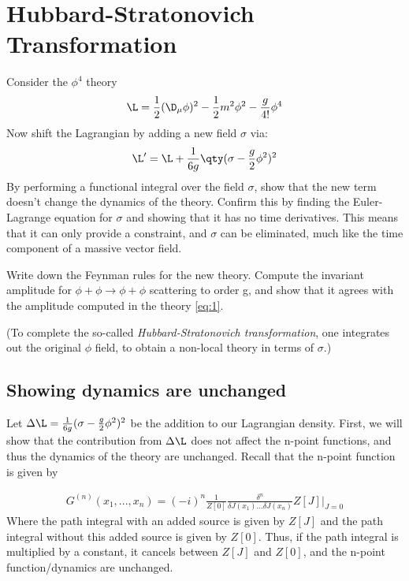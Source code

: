 \documentclass[12pt]{article}
\begin{document}
\section{Hubbard-Stratonovich Transformation}
\begin{problem}
  Consider the $\phi^4$ theory
  \begin{equation}
    \label{eq:1}
    \L=\frac12(\D_\mu\phi)^2-\frac12m^2\phi^2-\frac{g}{4!}\phi^4
  \end{equation}
  Now shift the Lagrangian by adding a new field $\sigma$ via:
  \begin{align*}
    \L'=\L+\frac1{6g}\qty(\sigma-\frac{g}2\phi^2)^2
  \end{align*}
  By performing a functional integral over the field $\sigma$, show that the new term doesn't change the dynamics of the theory. Confirm this by finding the Euler-Lagrange equation for $\sigma$ and showing that it has no time derivatives. This means that it can only provide a constraint, and $\sigma$ can be eliminated, much like the time component of a massive vector field.

  Write down the Feynman rules for the new theory. Compute the invariant amplitude for $\phi+\phi\to\phi+\phi$ scattering to order g, and show that it agrees with the amplitude computed in the theory \eqref{eq:1}.

  (To complete the so-called \emph{Hubbard-Stratonovich transformation}, one integrates out the original $\phi$ field, to obtain a non-local theory in terms of $\sigma$.)
\end{problem}

\subsection{Showing dynamics are unchanged}

Let $\Delta \L = \frac{1}{6g} (\sigma - \frac{g}{2} \phi^2)^2$ be the addition to our Lagrangian density. First, we will show that the contribution from $\Delta \L$ does not affect the n-point functions, and thus the dynamics of the theory are unchanged. Recall that the n-point function is given by

\begin{align*}
  G^{(n)}(x_1,...,x_n)=(-i)^n \frac{1}{Z[0]}\frac{\delta^n}{\delta J(x_1)...\delta J(x_n)}Z[J]|_{J=0} 
\end{align*}
Where the path integral with an added source is given by $Z[J]$ and the path integral without this added source is given by $Z[0]$. Thus, if the path integral is multiplied by a constant, it cancels between $Z[J]$ and $Z[0]$, and the n-point function/dynamics are unchanged.
\end{document}
